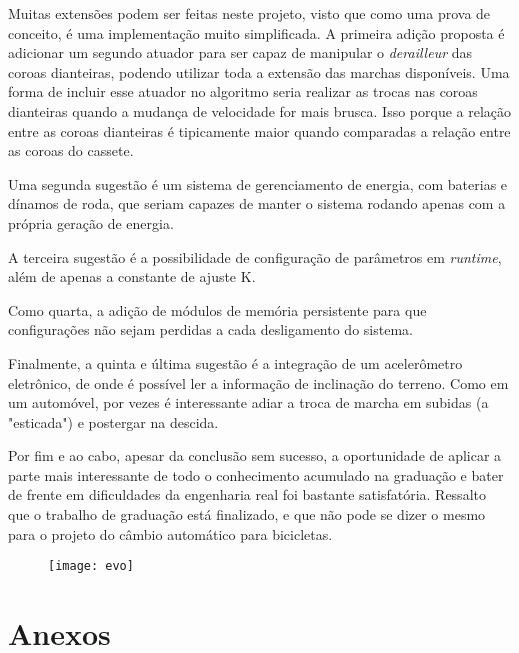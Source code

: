 \documentclass[a4paper,11pt]{article}
\begin{document}
Muitas extensões podem ser feitas neste projeto, visto que como uma prova de
conceito, é uma implementação muito simplificada. A primeira adição proposta
é adicionar um segundo atuador para ser capaz de manipular o
\textit{derailleur} das coroas dianteiras, podendo utilizar toda a extensão das
marchas disponíveis. Uma forma de incluir esse atuador no algoritmo seria
realizar as trocas nas coroas dianteiras quando a mudança de velocidade for
mais brusca. Isso porque a relação entre as coroas dianteiras é tipicamente
maior quando comparadas a relação entre as coroas do cassete.

Uma segunda sugestão é um sistema de gerenciamento de energia, com baterias e
dínamos de roda, que seriam capazes de manter o sistema rodando apenas com a
própria geração de energia.

A terceira sugestão é a possibilidade de configuração de parâmetros em
\textit{runtime}, além de apenas a constante de ajuste K.

Como quarta, a adição de módulos de memória persistente para
que configurações não sejam perdidas a cada desligamento do sistema.

Finalmente, a quinta e última sugestão é a integração de um acelerômetro
eletrônico, de onde é possível ler a informação de inclinação do terreno. Como
em um automóvel, por vezes é interessante adiar a troca de marcha em subidas (a
"esticada") e postergar na descida.

Por fim e ao cabo, apesar da conclusão sem sucesso, a oportunidade de aplicar a
parte mais interessante de todo o conhecimento acumulado na graduação e bater
de frente em dificuldades da engenharia real foi bastante satisfatória.
Ressalto que o trabalho de graduação está finalizado, e que não pode se dizer o
mesmo para o projeto do câmbio automático para bicicletas.

\begin{figure}[h!]
\begin{center}
 \texttt{[image: evo]}
\end{center}
\end{figure}


\pagebreak
%
\section{Anexos}
\label{sec:anexos}

%

%
\end{document}

